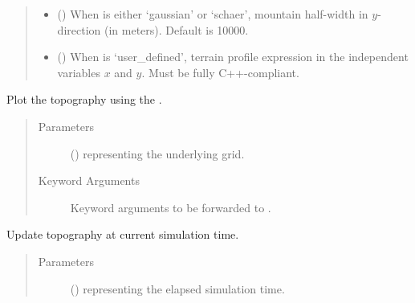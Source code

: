\documentclass[letterpaper,10pt,english]{sphinxmanual}
\begin{document}
\begin{fulllineitems}
\begin{fulllineitems}
\begin{quote}
\begin{description}
\begin{itemize}
\item {} 
 () \textendash{} When  is either ‘gaussian’ or ‘schaer’, mountain half-width in \(y\)-direction
(in meters). Default is 10000.

\item {} 
 () \textendash{} When  is ‘user\_defined’, terrain profile expression in the independent variables
\(x\) and \(y\). Must be fully C++-compliant.

\end{itemize}

\end{description}\end{quote}

\end{fulllineitems}


\begin{fulllineitems}
\label{\detokenize{api:grids.topography.Topography2d.plot}}
Plot the topography using the .
\begin{quote}\begin{description}
\item[{Parameters}] \leavevmode
{} () \textendash{} {\hyperref[\detokenize{api:grids.grid_xy.GridXY}]{}} representing the underlying grid.

\item[{Keyword Arguments}] \leavevmode
{} \textendash{} Keyword arguments to be forwarded to .

\end{description}\end{quote}

\end{fulllineitems}


\begin{fulllineitems}
\label{\detokenize{api:grids.topography.Topography2d.update}}
Update topography at current simulation time.
\begin{quote}\begin{description}
\item[{Parameters}] \leavevmode
{} () \textendash{}  representing the elapsed simulation time.


\end{description}
\end{quote}
\end{fulllineitems}
\end{fulllineitems}
\end{document}

